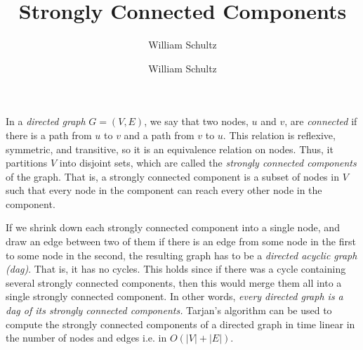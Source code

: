 \documentclass[10pt,a4paper]{article}
\author{William Schultz}
\begin{document}
\title{Strongly Connected Components}
\author{William Schultz}
\maketitle

In a \textit{directed graph} $G=(V,E)$, we say that two nodes, $u$ and $v$, are \textit{connected} if there is a path from $u$ to $v$ and a path from $v$ to $u$. This relation is reflexive, symmetric, and transitive, so it is an equivalence relation on nodes. Thus, it partitions $V$ into disjoint sets, which are called the \textit{strongly connected components} of the graph. That is, a strongly connected component is a subset of nodes in $V$ such that every node in the component can reach every other node in the component.

If we shrink down each strongly connected component into a single node, and draw an edge between two of them if there is an edge from some node in the first to some node in the second, the resulting graph has to be a \textit{directed acyclic graph (dag)}. That is, it has no cycles. This holds since if there was a cycle containing several strongly connected components, then this would merge them all into a single strongly connected component. In other words, \textit{every directed graph is a dag of its strongly connected components.} Tarjan's algorithm can be used to compute the strongly connected components of a directed graph in time linear in the number of nodes and edges i.e. in $O(|V| + |E|)$.

% 
% 
\end{document}

